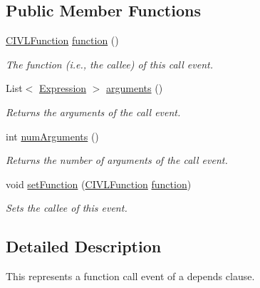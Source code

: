 \subsection*{Public Member Functions}
\begin{DoxyCompactItemize}
\item 
\hyperlink{interfaceedu_1_1udel_1_1cis_1_1vsl_1_1civl_1_1model_1_1IF_1_1CIVLFunction}{C\+I\+V\+L\+Function} \hyperlink{interfaceedu_1_1udel_1_1cis_1_1vsl_1_1civl_1_1model_1_1IF_1_1contract_1_1CallEvent_a06f8d238aca75f288316f087f20a1a50}{function} ()
\begin{DoxyCompactList}\small\item\em The function (i.\+e., the callee) of this call event. \end{DoxyCompactList}\item 
List$<$ \hyperlink{interfaceedu_1_1udel_1_1cis_1_1vsl_1_1civl_1_1model_1_1IF_1_1expression_1_1Expression}{Expression} $>$ \hyperlink{interfaceedu_1_1udel_1_1cis_1_1vsl_1_1civl_1_1model_1_1IF_1_1contract_1_1CallEvent_ab2fd14034417548bb7fbb2b305aef032}{arguments} ()
\begin{DoxyCompactList}\small\item\em Returns the arguments of the call event. \end{DoxyCompactList}\item 
int \hyperlink{interfaceedu_1_1udel_1_1cis_1_1vsl_1_1civl_1_1model_1_1IF_1_1contract_1_1CallEvent_ab67c6a874d2966ecba89c7ac9d095cf8}{num\+Arguments} ()
\begin{DoxyCompactList}\small\item\em Returns the number of arguments of the call event. \end{DoxyCompactList}\item 
void \hyperlink{interfaceedu_1_1udel_1_1cis_1_1vsl_1_1civl_1_1model_1_1IF_1_1contract_1_1CallEvent_a479b5abc78d39993427a454c87c08407}{set\+Function} (\hyperlink{interfaceedu_1_1udel_1_1cis_1_1vsl_1_1civl_1_1model_1_1IF_1_1CIVLFunction}{C\+I\+V\+L\+Function} \hyperlink{interfaceedu_1_1udel_1_1cis_1_1vsl_1_1civl_1_1model_1_1IF_1_1contract_1_1CallEvent_a06f8d238aca75f288316f087f20a1a50}{function})
\begin{DoxyCompactList}\small\item\em Sets the callee of this event. \end{DoxyCompactList}\end{DoxyCompactItemize}


\subsection{Detailed Description}
This represents a function call event of a {\ttfamily depends} clause. 

